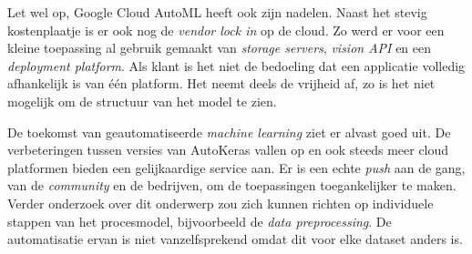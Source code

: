 Let wel op, Google Cloud AutoML heeft ook zijn nadelen. Naast het stevig kostenplaatje is er ook nog de \textit{vendor lock in} op de cloud. Zo werd er voor een kleine toepassing al gebruik gemaakt van \textit{storage servers}, \textit{vision API} en een \textit{deployment platform}. Als klant is het niet de bedoeling dat een applicatie volledig afhankelijk is van één platform. Het neemt deels de vrijheid af, zo is het niet mogelijk om de structuur van het model te zien. 

De toekomst van geautomatiseerde \textit{machine learning} ziet er alvast goed uit. De verbeteringen tussen versies van AutoKeras vallen op en ook steeds meer cloud platformen bieden een gelijkaardige service aan. Er is een echte \textit{push} aan de gang, van de \textit{community} en de bedrijven, om de toepassingen toegankelijker te maken. Verder onderzoek over dit onderwerp zou zich kunnen richten op individuele stappen van het procesmodel, bijvoorbeeld de \textit{data preprocessing}. De automatisatie ervan is niet vanzelfsprekend omdat dit voor elke dataset anders is.
